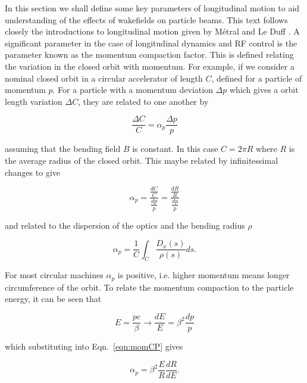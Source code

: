 \label{app:long_motion}

In this section we shall define some key parameters of longitudinal motion to aid understanding of the effects of wakefields on particle beams. This text follows closely the introductions to longitudinal motion given by Métral \cite{Metral:LongDyn} and Le Duff \cite{Leduff:LongDyn}. A significant parameter in the case of longitudinal dynamics and RF control is the parameter known as the momentum compaction factor. This is defined relating the variation in the closed orbit with momentum. For example, if we consider a nominal closed orbit in a circular accelerator of length $C$, defined for a particle of momentum $p$. For a particle with a momentum deviation $\Delta p$ which gives a orbit length variation $\Delta C$, they are related to one another by

\begin{equation}
\frac{\Delta C}{C} = \alpha_{p} \frac{\Delta p}{p}
\end{equation}

assuming that the bending field $B$ is constant. In this case $C=2\pi R$ where $R$ is the average radius of the closed orbit. This maybe related by infinitessimal changes to give

\begin{equation}
\alpha_{p} = \frac{\frac{dC}{C}}{\frac{dp}{p}} = \frac{\frac{dR}{R}}{\frac{dp}{p}}
\label{eqn:momCP}
\end{equation}

and related to the dispersion of the optics and the bending radius $\rho$

\begin{equation}
\alpha_{p} = \frac{1}{C}\int_{C}\frac{D_{x} \left( s \right)}{\rho\left( s \right)} ds.
\end{equation}

For most circular machines $\alpha_{p}$ is positive, i.e. higher momentum means longer circumference of the orbit. To relate the momentum compaction to the particle energy, it can be seen that 

\begin{equation}
E = \frac{pc}{\beta} \rightarrow \frac{dE}{E} = \beta^{2}\frac{dp}{p}
\end{equation}

which substituting into Eqn.~\ref{eqn:momCP} gives

\begin{equation}
\alpha_{p} = \beta^{2}\frac{E}{R}\frac{dR}{dE}.
\end{equation}

